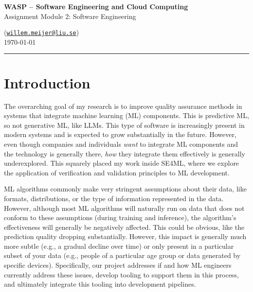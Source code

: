 


\usepackage{minted}



\begin{Large}
    \textsf{\textbf{WASP -- Software Engineering and Cloud Computing}}\\
    \textsf{Assignment Module 2: Software Engineering}
\end{Large}

\vspace{1ex}

 (\href{mailto:willem.meijer@liu.se}{\texttt{willem.meijer@liu.se}})\\
\today

\noindent\rule[0.5ex]{\linewidth}{1pt}

\section*{Introduction}



    The overarching goal of my research is to improve quality assurance methods in systems that integrate machine learning (ML) components.
    This is predictive ML, so not generative ML, like LLMs.
    This type of software is increasingly present in modern systems and is expected to grow substantially in the future.
    However, even though companies and individuals \textit{want} to integrate ML components and the technology is generally there, \textit{how} they integrate them effectively is generally underexplored.
    This squarely placed my work inside SE4ML, where we explore the application of verification and validation principles to ML development.
    
    ML algorithms commonly make very stringent assumptions about their data, like formats, distributions, or the type of information represented in the data.
    However, although most ML algorithms will naturally run on data that does not conform to these assumptions (during training and inference), the algorithm's effectiveness will generally be negatively affected.
    This could be obvious, like the prediction quality dropping substantially.
    However, this impact is generally much more subtle (e.g., a gradual decline over time) or only present in a particular subset of your data (e.g., people of a particular age group or data generated by specific devices).
    Specifically, our project addresses if and how ML engineers currently address these issues, develop tooling to support them in this process, and ultimately integrate this tooling into development pipelines.
    

